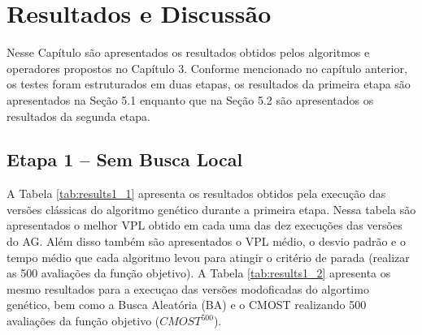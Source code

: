 \chapter{Resultados e Discussão}
\label{ch:5_ResultadosDiscucao}
Nesse Capítulo são apresentados os resultados obtidos pelos algoritmos e operadores propostos no Capítulo 3. Conforme mencionado no capítulo anterior, os testes foram estruturados em duas etapas, os resultados da primeira etapa são apresentados na Seção 5.1 enquanto que na Seção 5.2 são apresentados os resultados da segunda etapa.

\section{Etapa 1 – Sem Busca Local}
\label{ch:5_Etapa1}
A Tabela \ref{tab:results1_1} apresenta os resultados obtidos pela execução das versões clássicas do algoritmo genético durante a primeira etapa. Nessa tabela são apresentados o melhor VPL obtido em cada uma das dez execuções das versões do AG. Além disso também são apresentados o VPL médio, o desvio padrão e o tempo médio que cada algoritmo levou para atingir o critério de parada (realizar as 500 avaliações da função objetivo). A Tabela \ref{tab:results1_2} apresenta os mesmo resultados para a execuçao das versões modoficadas do algortimo genético, bem como a Busca Aleatória (BA) e o CMOST realizando 500 avaliações da função objetivo ($CMOST^{500}$).

